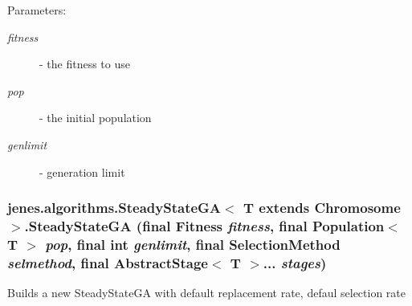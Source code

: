 \begin{Desc}
\item[Parameters:]
\begin{description}
\item[{\em fitness}]- the fitness to use \item[{\em pop}]- the initial population \item[{\em genlimit}]- generation limit \end{description}
\end{Desc}
\hypertarget{classjenes_1_1algorithms_1_1_steady_state_g_a_3_01_t_01extends_01_chromosome_01_4_5964a47d26b5831b9e821285e3e4cb8d}{
\subsubsection[SteadyStateGA]{\setlength{\rightskip}{0pt plus 5cm}jenes.algorithms.SteadyStateGA$<$ T extends Chromosome $>$.SteadyStateGA (final Fitness {\em fitness}, \/  final Population$<$ T $>$ {\em pop}, \/  final int {\em genlimit}, \/  final {\bf SelectionMethod} {\em selmethod}, \/  final AbstractStage$<$ T $>$... {\em stages})}}
\label{classjenes_1_1algorithms_1_1_steady_state_g_a_3_01_t_01extends_01_chromosome_01_4_5964a47d26b5831b9e821285e3e4cb8d}


Builds a new SteadyStateGA with default replacement rate, defaul selection rate

